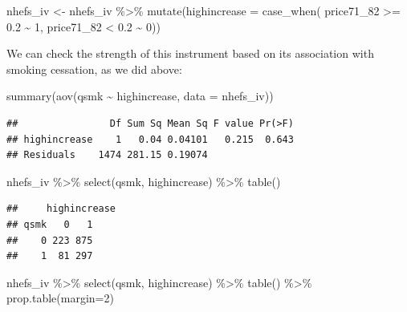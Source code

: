 \documentclass[
]{book}
\newenvironment{Shaded}{\begin{snugshade}}{\end{snugshade}}
\newcommand{\AttributeTok}[1]{\textcolor[rgb]{0.77,0.63,0.00}{#1}}
\newcommand{\DecValTok}[1]{\textcolor[rgb]{0.00,0.00,0.81}{#1}}
\newcommand{\FloatTok}[1]{\textcolor[rgb]{0.00,0.00,0.81}{#1}}
\newcommand{\FunctionTok}[1]{\textcolor[rgb]{0.00,0.00,0.00}{#1}}
\newcommand{\NormalTok}[1]{#1}
\newcommand{\OtherTok}[1]{\textcolor[rgb]{0.56,0.35,0.01}{#1}}
\newcommand{\SpecialCharTok}[1]{\textcolor[rgb]{0.00,0.00,0.00}{#1}}
\begin{document}
\begin{Shaded}
\begin{Highlighting}[]
\NormalTok{nhefs\_iv }\OtherTok{\textless{}{-}}\NormalTok{ nhefs\_iv }\SpecialCharTok{\%\textgreater{}\%} 
 \FunctionTok{mutate}\NormalTok{(}\AttributeTok{highincrease =} \FunctionTok{case\_when}\NormalTok{(}
\NormalTok{    price71\_82 }\SpecialCharTok{\textgreater{}=} \FloatTok{0.2} \SpecialCharTok{\textasciitilde{}} \DecValTok{1}\NormalTok{, }
\NormalTok{    price71\_82 }\SpecialCharTok{\textless{}} \FloatTok{0.2} \SpecialCharTok{\textasciitilde{}} \DecValTok{0}\NormalTok{))}
\end{Highlighting}
\end{Shaded}

We can check the strength of this instrument based on its association with smoking cessation, as we did above:

\begin{Shaded}
\begin{Highlighting}[]
\FunctionTok{summary}\NormalTok{(}\FunctionTok{aov}\NormalTok{(qsmk }\SpecialCharTok{\textasciitilde{}}\NormalTok{ highincrease, }\AttributeTok{data =}\NormalTok{ nhefs\_iv))}
\end{Highlighting}
\end{Shaded}

\begin{verbatim}
##                Df Sum Sq Mean Sq F value Pr(>F)
## highincrease    1   0.04 0.04101   0.215  0.643
## Residuals    1474 281.15 0.19074
\end{verbatim}

\begin{Shaded}
\begin{Highlighting}[]
\NormalTok{nhefs\_iv }\SpecialCharTok{\%\textgreater{}\%} 
  \FunctionTok{select}\NormalTok{(qsmk, highincrease) }\SpecialCharTok{\%\textgreater{}\%} 
  \FunctionTok{table}\NormalTok{()}
\end{Highlighting}
\end{Shaded}

\begin{verbatim}
##     highincrease
## qsmk   0   1
##    0 223 875
##    1  81 297
\end{verbatim}

\begin{Shaded}
\begin{Highlighting}[]
\NormalTok{nhefs\_iv }\SpecialCharTok{\%\textgreater{}\%} 
  \FunctionTok{select}\NormalTok{(qsmk, highincrease) }\SpecialCharTok{\%\textgreater{}\%} 
  \FunctionTok{table}\NormalTok{() }\SpecialCharTok{\%\textgreater{}\%} 
  \FunctionTok{prop.table}\NormalTok{(}\AttributeTok{margin=}\DecValTok{2}\NormalTok{)}
\end{Highlighting}
\end{Shaded}
\end{document}
